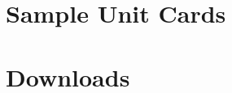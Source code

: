 \documentclass{article}
\newcommand{\mysectiontitle}{}
\newcommand{\newsection}[2]{\renewcommand{\mysectiontitle}{#2}\section{#1}}
\begin{document}
\newpage

\newsection{Sample Unit Cards}{sample-unit-cards}



\newpage

\newsection{Downloads}{downloads}
\label{sec:downloads}



\newpage
\end{document}
